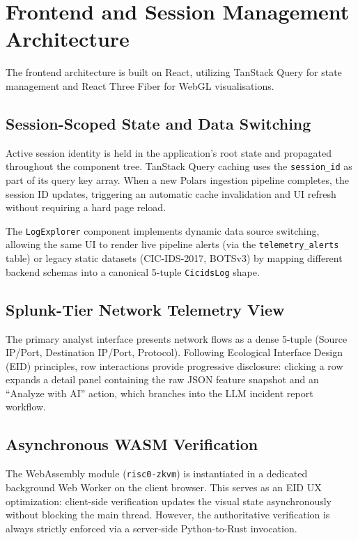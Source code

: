 \documentclass[12pt,a4paper]{article}
\begin{document}
\section{Frontend and Session Management Architecture}

The frontend architecture is built on React, utilizing TanStack Query for
state management and React Three Fiber for WebGL visualisations.

\subsection{Session-Scoped State and Data Switching}

Active session identity is held in the application's root state and propagated
throughout the component tree. TanStack Query caching uses the \texttt{session\_id}
as part of its query key array. When a new Polars ingestion pipeline completes,
the session ID updates, triggering an automatic cache invalidation and UI
refresh without requiring a hard page reload.

The \texttt{LogExplorer} component implements dynamic data source switching,
allowing the same UI to render live pipeline alerts (via the \texttt{telemetry\_alerts}
table) or legacy static datasets (CIC-IDS-2017, BOTSv3) by mapping different
backend schemas into a canonical 5-tuple \texttt{CicidsLog} shape.

\subsection{Splunk-Tier Network Telemetry View}

The primary analyst interface presents network flows as a dense 5-tuple
(Source IP/Port, Destination IP/Port, Protocol). Following Ecological Interface
Design (EID) principles, row interactions provide progressive disclosure: clicking
a row expands a detail panel containing the raw JSON feature snapshot and
an ``Analyze with AI'' action, which branches into the LLM incident report workflow.

\subsection{Asynchronous WASM Verification}

The WebAssembly module (\texttt{risc0-zkvm}) is instantiated in a dedicated
background Web Worker on the client browser. This serves as an EID UX
optimization: client-side verification updates the visual state asynchronously
without blocking the main thread. However, the authoritative verification is
always strictly enforced via a server-side Python-to-Rust invocation.
\end{document}
